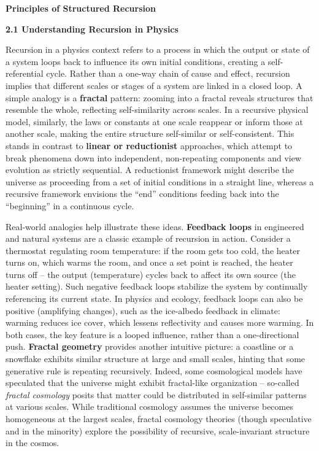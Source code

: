 \documentclass[
]{article}
\begin{document}
\textbf{Principles of Structured Recursion}

\textbf{2.1 Understanding Recursion in Physics}

Recursion in a physics context refers to a process in which the output
or state of a system loops back to influence its own initial conditions,
creating a self-referential cycle. Rather than a one-way chain of cause
and effect, recursion implies that different scales or stages of a
system are linked in a closed loop. A simple analogy is a
\textbf{fractal} pattern: zooming into a fractal reveals structures that
resemble the whole, reflecting self-similarity across
scales\hspace{0pt}. In a recursive physical model, similarly, the laws
or constants at one scale reappear or inform those at another scale,
making the entire structure self-similar or self-consistent. This stands
in contrast to \textbf{linear or reductionist} approaches, which attempt
to break phenomena down into independent, non-repeating components and
view evolution as strictly sequential. A reductionist framework might
describe the universe as proceeding from a set of initial conditions in
a straight line, whereas a recursive framework envisions the ``end''
conditions feeding back into the ``beginning'' in a continuous cycle.

Real-world analogies help illustrate these ideas. \textbf{Feedback
loops} in engineered and natural systems are a classic example of
recursion in action. Consider a thermostat regulating room temperature:
if the room gets too cold, the heater turns on, which warms the room,
and once a set point is reached, the heater turns off -- the output
(temperature) cycles back to affect its own source (the heater setting).
Such negative feedback loops stabilize the system by continually
referencing its current state. In physics and ecology, feedback loops
can also be positive (amplifying changes), such as the ice-albedo
feedback in climate: warming reduces ice cover, which lessens
reflectivity and causes more warming. In both cases, the key feature is
a looped influence, rather than a one-directional push. \textbf{Fractal
geometry} provides another intuitive picture: a coastline or a snowflake
exhibits similar structure at large and small scales, hinting that some
generative rule is repeating recursively. Indeed, some cosmological
models have speculated that the universe might exhibit fractal-like
organization -- so-called \emph{fractal cosmology} posits that matter
could be distributed in self-similar patterns at various
scales\hspace{0pt}. While traditional cosmology assumes the universe
becomes homogeneous at the largest scales, fractal cosmology theories
(though speculative and in the minority) explore the possibility of
recursive, scale-invariant structure in the cosmos\hspace{0pt}.
\end{document}
